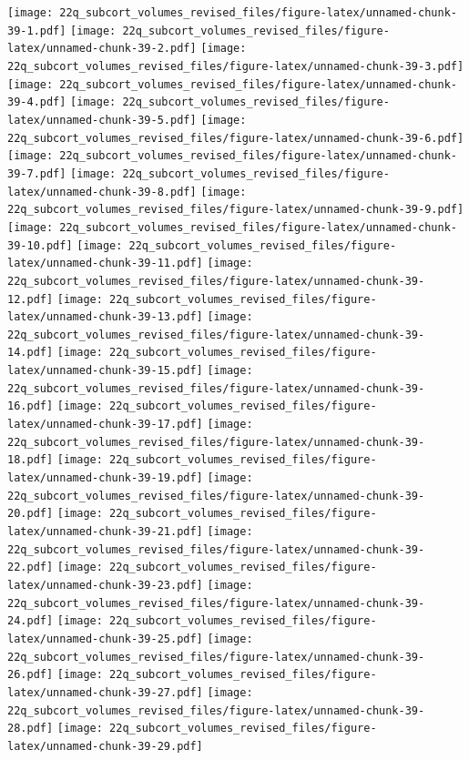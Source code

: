 \documentclass[
]{article}
\begin{document}
\texttt{[image: 22q\_subcort\_volumes\_revised\_files/figure-latex/unnamed-chunk-39-1.pdf]}
\texttt{[image: 22q\_subcort\_volumes\_revised\_files/figure-latex/unnamed-chunk-39-2.pdf]}
\texttt{[image: 22q\_subcort\_volumes\_revised\_files/figure-latex/unnamed-chunk-39-3.pdf]}
\texttt{[image: 22q\_subcort\_volumes\_revised\_files/figure-latex/unnamed-chunk-39-4.pdf]}
\texttt{[image: 22q\_subcort\_volumes\_revised\_files/figure-latex/unnamed-chunk-39-5.pdf]}
\texttt{[image: 22q\_subcort\_volumes\_revised\_files/figure-latex/unnamed-chunk-39-6.pdf]}
\texttt{[image: 22q\_subcort\_volumes\_revised\_files/figure-latex/unnamed-chunk-39-7.pdf]}
\texttt{[image: 22q\_subcort\_volumes\_revised\_files/figure-latex/unnamed-chunk-39-8.pdf]}
\texttt{[image: 22q\_subcort\_volumes\_revised\_files/figure-latex/unnamed-chunk-39-9.pdf]}
\texttt{[image: 22q\_subcort\_volumes\_revised\_files/figure-latex/unnamed-chunk-39-10.pdf]}
\texttt{[image: 22q\_subcort\_volumes\_revised\_files/figure-latex/unnamed-chunk-39-11.pdf]}
\texttt{[image: 22q\_subcort\_volumes\_revised\_files/figure-latex/unnamed-chunk-39-12.pdf]}
\texttt{[image: 22q\_subcort\_volumes\_revised\_files/figure-latex/unnamed-chunk-39-13.pdf]}
\texttt{[image: 22q\_subcort\_volumes\_revised\_files/figure-latex/unnamed-chunk-39-14.pdf]}
\texttt{[image: 22q\_subcort\_volumes\_revised\_files/figure-latex/unnamed-chunk-39-15.pdf]}
\texttt{[image: 22q\_subcort\_volumes\_revised\_files/figure-latex/unnamed-chunk-39-16.pdf]}
\texttt{[image: 22q\_subcort\_volumes\_revised\_files/figure-latex/unnamed-chunk-39-17.pdf]}
\texttt{[image: 22q\_subcort\_volumes\_revised\_files/figure-latex/unnamed-chunk-39-18.pdf]}
\texttt{[image: 22q\_subcort\_volumes\_revised\_files/figure-latex/unnamed-chunk-39-19.pdf]}
\texttt{[image: 22q\_subcort\_volumes\_revised\_files/figure-latex/unnamed-chunk-39-20.pdf]}
\texttt{[image: 22q\_subcort\_volumes\_revised\_files/figure-latex/unnamed-chunk-39-21.pdf]}
\texttt{[image: 22q\_subcort\_volumes\_revised\_files/figure-latex/unnamed-chunk-39-22.pdf]}
\texttt{[image: 22q\_subcort\_volumes\_revised\_files/figure-latex/unnamed-chunk-39-23.pdf]}
\texttt{[image: 22q\_subcort\_volumes\_revised\_files/figure-latex/unnamed-chunk-39-24.pdf]}
\texttt{[image: 22q\_subcort\_volumes\_revised\_files/figure-latex/unnamed-chunk-39-25.pdf]}
\texttt{[image: 22q\_subcort\_volumes\_revised\_files/figure-latex/unnamed-chunk-39-26.pdf]}
\texttt{[image: 22q\_subcort\_volumes\_revised\_files/figure-latex/unnamed-chunk-39-27.pdf]}
\texttt{[image: 22q\_subcort\_volumes\_revised\_files/figure-latex/unnamed-chunk-39-28.pdf]}
\texttt{[image: 22q\_subcort\_volumes\_revised\_files/figure-latex/unnamed-chunk-39-29.pdf]}
\end{document}
